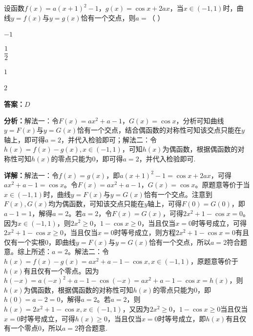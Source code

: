 \begin{question}[points=5]
设函数$f(x)=a(x+1)^2-1$，$g(x)=\cos x+2ax$，当$x\in(-1,1)$时，曲线$y=f(x)$与$y=g(x)$恰有一个交点，则$a=$（ ）
\begin{choices}
  \item $-1$
  \item $\dfrac{1}{2}$
  \item $1$
  \item $2$
\end{choices}
\begin{solution}
\textbf{答案：}$D$

\textbf{分析：}解法一：令$F(x)=ax^2+a-1$，$G(x)=\cos x$，分析可知曲线$y=F(x)$与$y=G(x)$恰有一个交点，结合偶函数的对称性可知该交点只能在$y$轴上，即可得$a=2$，并代入检验即可；解法二：令$h(x)=f(x)-g(x),x\in(-1,1)$，可知$h(x)$为偶函数，根据偶函数的对称性可知$h(x)$的零点只能为0，即可得$a=2$，并代入检验即可.

\textbf{详解：}解法一：令$f(x)=g(x)$，即$a(x+1)^2-1=\cos x+2ax$，可得$ax^2+a-1=\cos x$。令$F(x)=ax^2+a-1$，$G(x)=\cos x$。原题意等价于当$x\in(-1,1)$时，曲线$y=F(x)$与$y=G(x)$恰有一个交点。注意到$F(x),G(x)$均为偶函数，可知该交点只能在$y$轴上，可得$F(0)=G(0)$，即$a-1=1$，解得$a=2$。若$a=2$，令$F(x)=G(x)$，可得$2x^2+1-\cos x=0$。因为$x\in(-1,1)$，则$2x^2\ge0$，$1-\cos x\ge0$，当且仅当$x=0$时等号成立，可得$2x^2+1-\cos x\ge0$，当且仅当$x=0$时等号成立，则方程$2x^2+1-\cos x=0$有且仅有一个实根0，即曲线$y=F(x)$与$y=G(x)$恰有一个交点，所以$a=2$符合题意。综上所述：$a=2$。解法二：令$h(x)=f(x)-g(x)=ax^2+a-1-\cos x,x\in(-1,1)$，原题意等价于$h(x)$有且仅有一个零点。因为$h(-x)=a(-x)^2+a-1-\cos(-x)=ax^2+a-1-\cos x=h(x)$，则$h(x)$为偶函数，根据偶函数的对称性可知$h(x)$的零点只能为0，即$h(0)=a-2=0$，解得$a=2$。若$a=2$，则$h(x)=2x^2+1-\cos x,x\in(-1,1)$，又因为$2x^2\ge0$，$1-\cos x\ge0$当且仅当$x=0$时等号成立，可得$h(x)\ge0$，当且仅当$x=0$时等号成立，即$h(x)$有且仅有一个零点0，所以$a=2$符合题意.
\end{solution}
\end{question}

